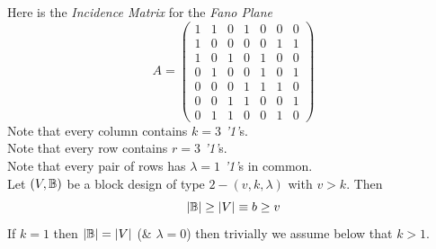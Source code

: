 \documentclass[11pt,a4paper]{article}
\begin{document}
Here is the \textit{Incidence Matrix} for the \textit{Fano Plane}
$$A=\begin{pmatrix}1&1&0&1&0&0&0\\1&0&0&0&0&1&1\\1&0&1&0&1&0&0\\0&1&0&0&1&0&1\\0&0&0&1&1&1&0\\0&0&1&1&0&0&1\\0&1&1&0&0&1&0\end{pmatrix}$$
Note that every column contains $k=3$ \textit{'1'}s.\\
Note that every row contains $r=3$ \textit{'1'}s.\\
Note that every pair of rows has $\lambda=1$ \textit{'1'}s in common.\\

Let $(V,\mathbb{B})$ be a block design of type $2-(v,k,\lambda)$ with $v>k$. Then
$$|\mathbb{B}|\geq|V|\equiv b\geq v$$
\nb If $k=1$ then $|\mathbb{B}|=|V|$ (\& $\lambda=0$) then trivially we assume below that $k>1$.\\
\end{document}
